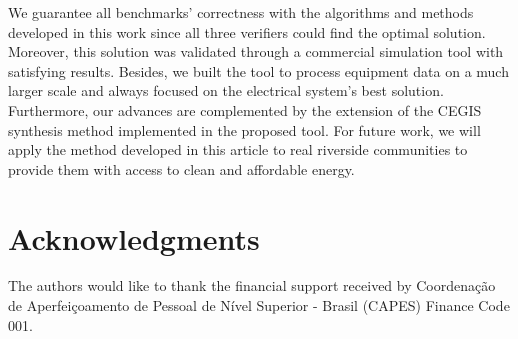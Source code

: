 \documentclass[review]{elsarticle}
\begin{document}
We guarantee all benchmarks' correctness with the algorithms and methods developed in this work since all three verifiers could find the optimal solution. Moreover, this solution was validated through a commercial simulation tool with satisfying results. Besides, we built the tool to process equipment data on a much larger scale and always focused on the electrical system's best solution. Furthermore, our advances are complemented by the extension of the CEGIS synthesis method implemented in the proposed tool. For future work, we will apply the method developed in this article to real riverside communities to provide them with access to clean and affordable energy.

\section*{Acknowledgments}
The authors would like to thank the financial support received by Coordenação de Aperfeiçoamento de Pessoal de Nível Superior - Brasil (CAPES) Finance Code 001.

%
%

%
%


%
\end{document}
